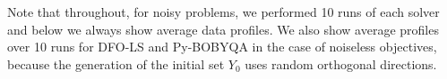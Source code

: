 
Note that throughout, for noisy problems, we performed 10 runs of each solver and below we always show average data profiles.
We also show average profiles over 10 runs for DFO-LS and Py-BOBYQA in the case of noiseless objectives, because the generation of the initial set $Y_0$ uses random orthogonal directions.

